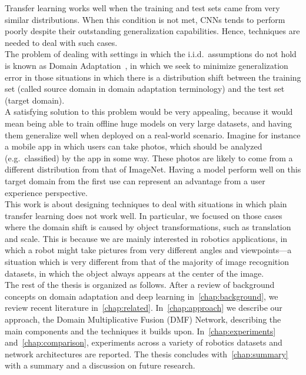 \documentclass[../main.tex]{subfiles}
\begin{document}
    Transfer learning works well when the training and test sets came from very similar distributions. When this condition
    is not met, CNNs tends to perform poorly despite their outstanding generalization capabilities.
    Hence, techniques are needed to deal with such cases. \\
	The problem of dealing with settings in which the i.i.d.\ assumptions
	do not hold is known as Domain Adaptation~\cite{domain-adaptation-review}, in which we seek to minimize generalization error
	in those situations in which there is a distribution shift between the training set
	(called source domain in domain adaptation terminology) and the test set (target domain). \\
    A satisfying solution to this problem would be very appealing, because it would mean being able to train offline huge
	models on very large datasets,
    and having them generalize well when deployed on a real-world scenario. Imagine for instance a mobile app in which users can
    take photos, which should be analyzed (e.g.\ classified) by the app in some way. These photos are likely to come from a different
    distribution from that of ImageNet. Having a model perform well on this target domain from the first use can represent an
	advantage from a user experience perspective. \\

    This work is about designing techniques to deal with situations in which plain transfer learning does not work well.
	In particular, we focused on those cases where the domain shift is caused by object transformations, such as
    translation and scale. This is because we are mainly interested in robotics applications, in which a robot
    might take pictures from very different angles and viewpoints---a situation which is very different from that of
    the majority of image recognition datasets, in which the object always appears at the center of the image. \\

    The rest of the thesis is organized as follows. After a review of background concepts on domain
    adaptation and deep learning in~\autoref{chap:background}, we review recent literature in~\autoref{chap:related}.
    In~\autoref{chap:approach} we describe our approach, the Domain Multiplicative Fusion (DMF) Network, describing
    the main components and the techniques it builds upon. In~\autoref{chap:experiments} and~\autoref{chap:comparison},
    experiments across a variety of robotics datasets and network architectures are reported.
    The thesis concludes with~\autoref{chap:summary} with a summary and a discussion on future research.
\end{document}
